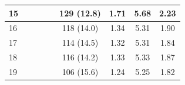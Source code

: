 \begin{table}[]
\begin{tabular}{|l|c|c|c|c|c|c|c|c|}
15                                    &                   &                     &                   &                       & 129 (12.8)        & 1.71                & 5.68              & 2.23                  \\ \hline
16                                    &                   &                     &                   &                       & 118 (14.0)        & 1.34                & 5.31              & 1.90                  \\ \hline
17                                    &                   &                     &                   &                       & 114 (14.5)        & 1.32                & 5.31              & 1.84                  \\ \hline
18                                    &                   &                     &                   &                       & 116 (14.2)        & 1.33                & 5.33              & 1.87                  \\ \hline
19                                    &                   &                     &                   &                       & 106 (15.6)        & 1.24                & 5.25              & 1.82                  \\ \hline
\end{tabular}
\end{table}

